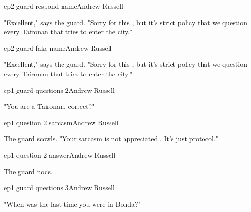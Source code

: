 \documentclass{book}
\begin{document}
\begin{childnode}{ep2 guard respond name}{Andrew Russell}

    "Excellent," says the guard. "Sorry for this \name{}, but it's strict policy that we question every Taironan that tries to enter the city."


\end{childnode}

\begin{childnode}{ep2 guard fake name}{Andrew Russell}

    "Excellent," says the guard. "Sorry for this \fakename{}, but it's strict policy that we question every Taironan that tries to enter the city."


\end{childnode}

\begin{childnode}{ep1 guard questions 2}{Andrew Russell}

    "You are a Taironan, correct?"



\end{childnode}

\begin{childnode}{ep1 question 2 sarcasm}{Andrew Russell}

The guard scowls. "Your sarcasm is not appreciated \mistermiss{} . It's just protocol."


\end{childnode}

\begin{childnode}{ep1 question 2 answer}{Andrew Russell}

    The guard nods.


\end{childnode}

\begin{childnode}{ep1 guard questions 3}{Andrew Russell}

    "When was the last time you were in Bonda?"




\end{childnode}
\end{document}
